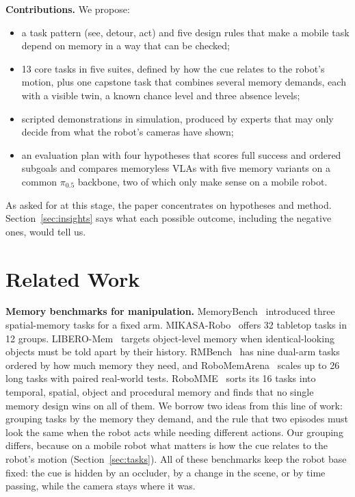 \documentclass[conference]{IEEEtran}
\newcommand{\pizf}{$\pi_{0.5}$}
\begin{document}
\textbf{Contributions.} We propose:
\begin{itemize}
\item a task pattern (see, detour, act) and five design rules that make a mobile task depend on memory in a way that can be checked;
\item 13 core tasks in five suites, defined by how the cue relates to the robot's motion, plus one capstone task that combines several memory demands, each with a visible twin, a known chance level and three absence levels;
\item scripted demonstrations in simulation, produced by experts that may only decide from what the robot's cameras have shown;
\item an evaluation plan with four hypotheses that scores full success and ordered subgoals and compares memoryless VLAs with five memory variants on a common \pizf{} backbone, two of which only make sense on a mobile robot.
\end{itemize}
As asked for at this stage, the paper concentrates on hypotheses and method. Section~\ref{sec:insights} says what each possible outcome, including the negative ones, would tell us.

\section{Related Work}

\textbf{Memory benchmarks for manipulation.} MemoryBench~\cite{fang2025sam2act} introduced three spatial-memory tasks for a fixed arm. MIKASA-Robo~\cite{cherepanov2026mikasa} offers 32 tabletop tasks in 12 groups. LIBERO-Mem~\cite{chung2026libero} targets object-level memory when identical-looking objects must be told apart by their history. RMBench~\cite{chen2026rmbench} has nine dual-arm tasks ordered by how much memory they need, and RoboMemArena~\cite{lei2026robomemarena} scales up to 26 long tasks with paired real-world tests. RoboMME~\cite{dai2026robomme} sorts its 16 tasks into temporal, spatial, object and procedural memory and finds that no single memory design wins on all of them. We borrow two ideas from this line of work: grouping tasks by the memory they demand, and the rule that two episodes must look the same when the robot acts while needing different actions. Our grouping differs, because on a mobile robot what matters is how the cue relates to the robot's motion (Section~\ref{sec:tasks}). All of these benchmarks keep the robot base fixed: the cue is hidden by an occluder, by a change in the scene, or by time passing, while the camera stays where it was.
\end{document}
